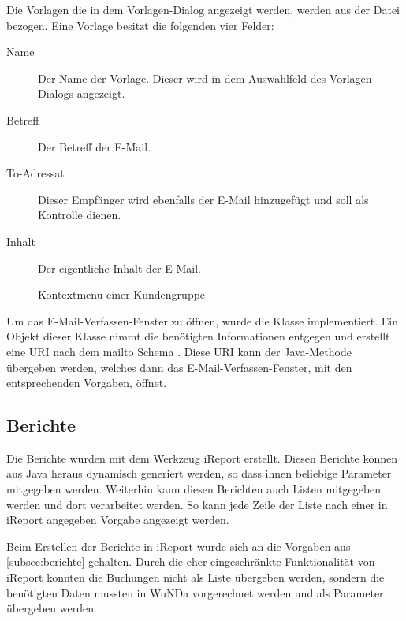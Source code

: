 Die Vorlagen die in dem Vorlagen-Dialog angezeigt werden, werden aus der Datei  bezogen. Eine Vorlage besitzt die folgenden vier Felder:
\begin{description}
\item[Name] Der Name der Vorlage. Dieser wird in dem Auswahlfeld des Vorlagen-Dialogs angezeigt.
\item[Betreff] Der Betreff der E-Mail.
\item[To-Adressat] Dieser Empfänger wird ebenfalls der E-Mail hinzugefügt und soll als Kontrolle dienen.
\item[Inhalt] Der eigentliche Inhalt der E-Mail.
\end{description}

\begin{figure}[htb]
	\centering
	\caption{Kontextmenu einer Kundengruppe}
	\label{fig:gui-kundengruppe-context}
\end{figure}
Um das E-Mail-Verfassen-Fenster zu öffnen, wurde die Klasse  implementiert.
Ein Objekt dieser Klasse nimmt die benötigten Informationen entgegen und erstellt eine URI nach dem mailto Schema \autocite{RFC2368}.
Diese URI kann der Java-Methode  \autocite{java-mailto} übergeben werden, welches dann das E-Mail-Verfassen-Fenster, mit den entsprechenden Vorgaben, öffnet.

\subsection{Berichte}
Die Berichte wurden mit dem Werkzeug iReport erstellt. Diesen Berichte können aus Java heraus dynamisch generiert werden, so dass ihnen beliebige Parameter mitgegeben werden.
Weiterhin kann diesen Berichten auch Listen mitgegeben werden und dort verarbeitet werden.
So kann jede Zeile der Liste nach einer in iReport angegeben Vorgabe angezeigt werden.

Beim Erstellen der Berichte in iReport wurde sich an die Vorgaben aus \autoref{subsec:berichte} gehalten.
Durch die eher eingeschränkte Funktionalität von iReport konnten die Buchungen nicht als Liste übergeben werden, sondern die benötigten Daten mussten in \ac{WuNDa} vorgerechnet werden und als Parameter übergeben werden.

